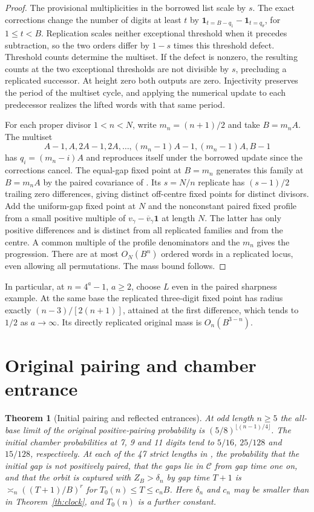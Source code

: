 \documentclass[11pt]{amsart}
\newtheorem{theorem}{Theorem}
\theoremstyle{definition}
\newcommand{\one}{\mathbf 1}
\newcommand{\C}{\mathcal C}
\begin{document}
\begin{proof}
The provisional multiplicities in the borrowed list scale by
\(s\). The exact corrections change the number of digits
at least \(t\) by \(\one_{t=B-q_1}-\one_{t=q_\theta}\), for
\(1\le t<B\). Replication scales neither exceptional threshold
when it precedes subtraction, so the two orders differ by
\(1-s\) times this threshold defect. Threshold counts determine
the multiset. If the defect is nonzero, the resulting counts
at the two exceptional thresholds are not divisible by \(s\),
precluding a replicated successor. At height zero both
outputs are zero. Injectivity preserves the period of the
multiset cycle, and applying the numerical update to each
predecessor realizes the lifted words with that same period.

For each proper divisor \(1<n<N\), write \(m_n=(n+1)/2\) and
take \(B=m_n A\). The multiset
\[
 A-1,A,2A-1,2A,\ldots,(m_n-1)A-1,(m_n-1)A,B-1
\]
has \(q_i=(m_n-i)A\) and reproduces itself under the borrowed
update since the corrections cancel. The equal-gap fixed point at
\(B=m_n\) generates this family at \(B=m_nA\) by the paired covariance
of \cite[Theorem~4 and Section~6]{G4}.
Its \(s=N/n\) replicate has \((s-1)/2\) trailing zero
differences, giving distinct off-centre fixed points for
distinct divisors. Add the uniform-gap fixed point at \(N\)
and the nonconstant paired fixed profile from a small positive
multiple of \(v_\gamma-\overline v_\gamma\one\) at length \(N\).
The latter has only positive differences and is distinct from
all replicated families and from the centre. A common multiple
of the profile denominators and the \(m_n\) gives the progression.
There are at most \(O_N(B^n)\) ordered words in a replicated
locus, even allowing all permutations. The mass bound follows.
\end{proof}

In particular, at \(n=4^a-1\), \(a\ge2\), choose \(L\) even
in the paired sharpness example. At the same base the replicated
three-digit fixed point has radius exactly \((n-3)/[2(n+1)]\), attained
at the first difference, which tends to \(1/2\) as \(a\to\infty\).
Its directly replicated original mass is \(O_n(B^{3-n})\).

\section{Original pairing and chamber entrance}\label{sec:entrance}

\begin{theorem}[Initial pairing and reflected entrances]\label{th:sibling}
At odd length \(n\ge5\) the all-base limit of the original
positive-pairing probability is
\((5/8)^{\lfloor(n-1)/4\rfloor}\).
The initial chamber probabilities at 7, 9 and 11 digits
tend to \(5/16\), \(25/128\) and \(15/128\), respectively.
At each of the 47 strict lengths in \cite{G9}, the
probability that the initial gap is not positively paired, that the
gaps lie in \(\C\) from gap time one on, and that the orbit is captured
with \(Z_B>\delta_n\) by gap time \(T+1\) is
\(\asymp_n((T+1)/B)^r\) for \(T_0(n)\le T\le c_nB\).
Here \(\delta_n\) and \(c_n\) may be smaller than in
Theorem~\ref{th:clock}, and \(T_0(n)\) is a further constant.
\end{theorem}
\end{document}
